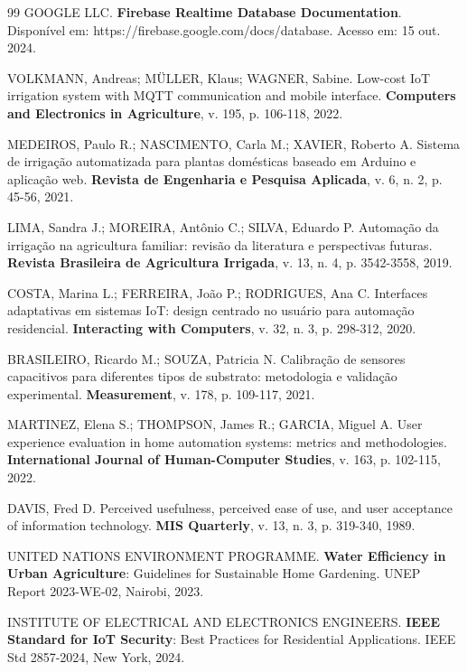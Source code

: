 \documentclass[twoside,english,brazilian]{UNISINOSmonografia}
\begin{document}
\begin{thebibliography}{99}
GOOGLE LLC. \textbf{Firebase Realtime Database Documentation}. Disponível em: https://firebase.google.com/docs/database. Acesso em: 15 out. 2024.

VOLKMANN, Andreas; MÜLLER, Klaus; WAGNER, Sabine. Low-cost IoT irrigation system with MQTT communication and mobile interface. \textbf{Computers and Electronics in Agriculture}, v. 195, p. 106-118, 2022.

MEDEIROS, Paulo R.; NASCIMENTO, Carla M.; XAVIER, Roberto A. Sistema de irrigação automatizada para plantas domésticas baseado em Arduino e aplicação web. \textbf{Revista de Engenharia e Pesquisa Aplicada}, v. 6, n. 2, p. 45-56, 2021.

LIMA, Sandra J.; MOREIRA, Antônio C.; SILVA, Eduardo P. Automação da irrigação na agricultura familiar: revisão da literatura e perspectivas futuras. \textbf{Revista Brasileira de Agricultura Irrigada}, v. 13, n. 4, p. 3542-3558, 2019.

COSTA, Marina L.; FERREIRA, João P.; RODRIGUES, Ana C. Interfaces adaptativas em sistemas IoT: design centrado no usuário para automação residencial. \textbf{Interacting with Computers}, v. 32, n. 3, p. 298-312, 2020.

BRASILEIRO, Ricardo M.; SOUZA, Patricia N. Calibração de sensores capacitivos para diferentes tipos de substrato: metodologia e validação experimental. \textbf{Measurement}, v. 178, p. 109-117, 2021.

MARTINEZ, Elena S.; THOMPSON, James R.; GARCIA, Miguel A. User experience evaluation in home automation systems: metrics and methodologies. \textbf{International Journal of Human-Computer Studies}, v. 163, p. 102-115, 2022.

DAVIS, Fred D. Perceived usefulness, perceived ease of use, and user acceptance of information technology. \textbf{MIS Quarterly}, v. 13, n. 3, p. 319-340, 1989.

UNITED NATIONS ENVIRONMENT PROGRAMME. \textbf{Water Efficiency in Urban Agriculture}: Guidelines for Sustainable Home Gardening. UNEP Report 2023-WE-02, Nairobi, 2023.

INSTITUTE OF ELECTRICAL AND ELECTRONICS ENGINEERS. \textbf{IEEE Standard for IoT Security}: Best Practices for Residential Applications. IEEE Std 2857-2024, New York, 2024.

\end{thebibliography}
\end{document}
